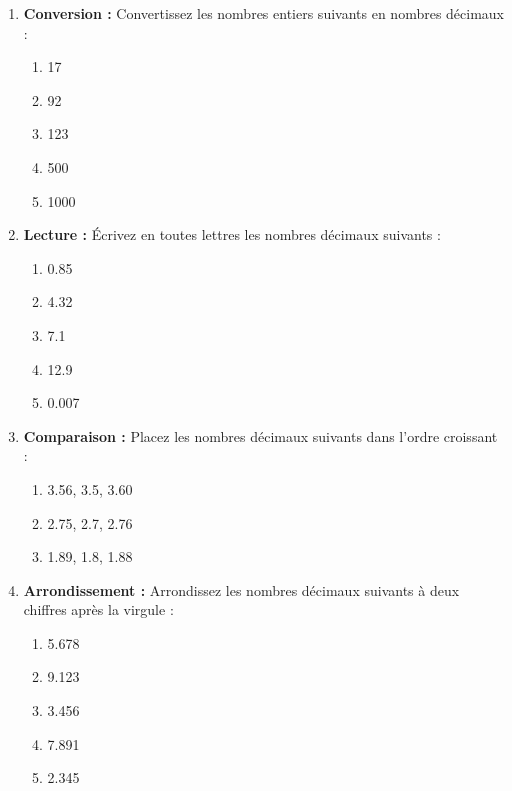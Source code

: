 \documentclass{article}
\begin{document}
\begin{tcolorbox}[colback=yellow!10!white, colframe=yellow!75!black, sharp corners=south, boxrule=0.8mm, title=Exercices]
    \begin{enumerate}[label=\textbf{\arabic*.}]
        \item \textbf{Conversion :} Convertissez les nombres entiers suivants en nombres décimaux :
            \begin{enumerate}
                \item 17
                \item 92
                \item 123
                \item 500
                \item 1000
            \end{enumerate}

        \item \textbf{Lecture :} Écrivez en toutes lettres les nombres décimaux suivants :
            \begin{enumerate}
                \item 0.85
                \item 4.32
                \item 7.1
                \item 12.9
                \item 0.007
            \end{enumerate}

        \item \textbf{Comparaison :} Placez les nombres décimaux suivants dans l'ordre croissant :
            \begin{enumerate}
                \item 3.56, 3.5, 3.60
                \item 2.75, 2.7, 2.76
                \item 1.89, 1.8, 1.88
            \end{enumerate}

        \item \textbf{Arrondissement :} Arrondissez les nombres décimaux suivants à deux chiffres après la virgule :
            \begin{enumerate}
                \item 5.678
                \item 9.123
                \item 3.456
                \item 7.891
                \item 2.345
            \end{enumerate}


\end{enumerate}
\end{tcolorbox}
\end{document}
